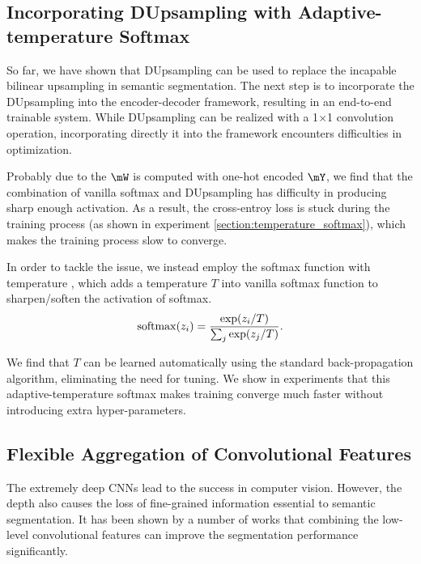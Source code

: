 \documentclass[10pt,twocolumn,letterpaper]{article}
\def\softmax{{\rm softmax}}
\newcommand{\1}{{\mathbbm{1}}}
\begin{document}
\subsection{Incorporating DUpsampling with Adaptive-temperature Softmax}

So far, we have shown that DUpsampling can be used to replace the incapable bilinear upsampling in semantic segmentation. The next step is to incorporate the DUpsampling into the encoder-decoder framework, resulting in an end-to-end trainable system. While DUpsampling can be realized with a 1$\times$1 convolution operation, incorporating directly it into the framework encounters difficulties in optimization.

Probably due to the $\mW$ is computed with one-hot encoded $\mY$, we find that the combination of vanilla softmax and DUpsampling has difficulty in producing sharp enough activation. As a result, the cross-entroy loss is stuck during the training process (as shown in experiment \ref{section:temperature_softmax}), which makes the training process slow to converge.




In order to tackle the issue, we instead employ the softmax function with temperature \cite{hinton2015distilling}, which adds a temperature $T$ into vanilla softmax function to sharpen/soften the activation of softmax.
\begin{equation}
\softmax(z_i) = \frac{\exp({z_i/T})}{\sum_{j} \exp(z_j/T)}.
\end{equation}

We find that $T$ can be learned automatically using the standard back-propagation algorithm, eliminating the need for tuning. We show in experiments that this adaptive-temperature softmax makes training converge much faster without introducing extra hyper-parameters.


\subsection{Flexible Aggregation of Convolutional Features}
The extremely deep CNNs \cite{he2016deep, chollet2017xception, huang2017densely} lead to the success in computer vision. However, the depth also causes the loss of fine-grained information essential to semantic segmentation. It has been shown by a number of works \cite{lin2017refinenet, chen2018encoder} that combining the low-level convolutional features can improve the segmentation performance significantly.
\end{document}
